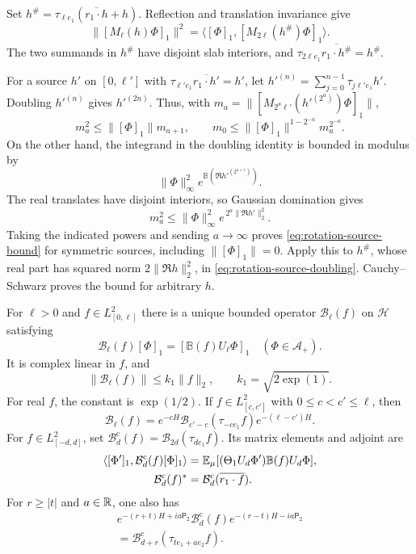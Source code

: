 Set $h^\#=\tau_{\ell e_1}(\overline{r_1\cdot h}+h)$.
Reflection and translation invariance give
\begin{equation}\label{eq:rotation-source-doubling}
 \|[M_\ell(h)\Phi]_1\|^2
   =\langle[\Phi]_1,[M_{2\ell}(h^\#)\Phi]_1\rangle.
\end{equation}
The two summands in $h^\#$ have disjoint slab interiors, and
$\tau_{2\ell e_1}\overline{r_1\cdot h^\#}=h^\#$.

For a source $h'$ on $[0,\ell']$ with
$\tau_{\ell'e_1}\overline{r_1\cdot h'}=h'$, let
$h'^{(n)}=\sum_{j=0}^{n-1}\tau_{j\ell'e_1}h'$.
Doubling $h'^{(n)}$ gives $h'^{(2n)}$. Thus, with
$m_a=\|[M_{2^a\ell'}(h'^{(2^a)})\Phi]_1\|$,
\[
 m_a^2\le\|[\Phi]_1\|m_{a+1},\qquad
 m_0\le\|[\Phi]_1\|^{1-2^{-a}}m_a^{2^{-a}}.
\]
On the other hand, the integrand in the doubling identity is bounded
in modulus by
\[
 \|\Phi\|_\infty^2e^{\mathbb B(\Re h'^{(2^{a+1})})}.
\]
The real translates have disjoint interiors, so Gaussian domination
gives
\[
 m_a^2\le\|\Phi\|_\infty^2
       e^{\,2^a\|\Re h'\|_2^2}.
\]
Taking the indicated powers and sending $a\to\infty$ proves
\eqref{eq:rotation-source-bound} for symmetric sources, including
$\|[\Phi]_1\|=0$. Apply this to $h^\#$, whose real part has squared
norm $2\|\Re h\|_2^2$, in
\eqref{eq:rotation-source-doubling}. Cauchy--Schwarz proves the
bound for arbitrary $h$.

\begin{proposition}\label{prop:rotation-insertion}
For $\ell>0$ and $f\in L^2_{[0,\ell]}$ there is a unique bounded
operator $\mathcal B_\ell(f)$ on $\mathcal H$ satisfying
\[
 \mathcal B_\ell(f)[\Phi]_1
       =[\mathbb B(f)U_\ell\Phi]_1\quad(\Phi\in\mathcal A_+).
\]
It is complex linear in $f$, and
\begin{equation}\label{eq:rotation-insertion-bound}
 \|\mathcal B_\ell(f)\|\le k_1\|f\|_2,\qquad
 k_1=\sqrt{2\exp(1)}.
\end{equation}
For real $f$, the constant is $\exp(1/2)$.
If $f\in L^2_{[c,c']}$ with $0\le c<c'\le\ell$, then
\begin{equation}\label{eq:rotation-insertion-local}
 \mathcal B_\ell(f)=e^{-cH}
       \mathcal B_{c'-c}(\tau_{-ce_1}f)e^{-(\ell-c')H}.
\end{equation}
For $f\in L^2_{[-d,d]}$, set
$\mathcal B_d^{\mathrm c}(f)=\mathcal B_{2d}(\tau_{de_1}f)$.
Its matrix elements and adjoint are
\begin{align}
 \langle[\Phi']_1,\mathcal B_d^{\mathrm c}(f)[\Phi]_1\rangle
   &=\mathbb E_\mu[(\Theta_1U_d\Phi')\mathbb B(f)U_d\Phi],
                         \label{eq:rotation-insertion-centered}\\
 \mathcal B_d^{\mathrm c}(f)^*
   &=\mathcal B_d^{\mathrm c}(\overline{r_1\cdot f}).\notag
\end{align}
For $r\ge|t|$ and $a\in\mathbb R$, one also has
\begin{multline}\label{eq:rotation-insertion-shift}
 e^{-(r+t)H+ia\mathsf P_2}\mathcal B_d^{\mathrm c}(f)
           e^{-(r-t)H-ia\mathsf P_2}\\
       =\mathcal B_{d+r}^{\mathrm c}(\tau_{te_1+ae_2}f).
\end{multline}
\end{proposition}

